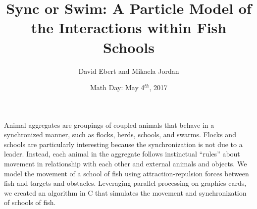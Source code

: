 \documentclass{article}
\title{Sync or Swim: A Particle Model of the Interactions within Fish Schools}
\author{David Ebert and Mikaela Jordan}
\date{Math Day: May 4$^{th}$, 2017}
\begin{document}
\maketitle
Animal aggregates are groupings of coupled animals that behave in a synchronized manner, such as flocks, herds, schools, and swarms.  Flocks and schools are particularly interesting because the synchronization is not due to a leader.  Instead, each animal in the aggregate follows instinctual ``rules'' about movement in relationship with each other and external animals and objects. We model the movement of a school of fish using attraction-repulsion forces between fish and targets and obstacles. Leveraging parallel processing on graphics cards, we created an algorithm in C that simulates the movement and synchronization of schools of fish.
\end{document}
